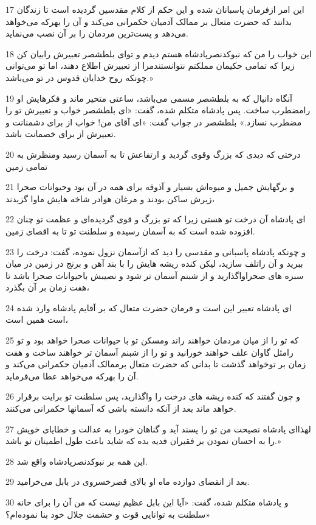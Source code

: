 \par 17 این امر ازفرمان پاسبانان شده و این حکم از کلام مقدسین گردیده است تا زندگان بدانند که حضرت متعال بر ممالک آدمیان حکمرانی می‌کند و آن را بهرکه می‌خواهد می‌دهد و پست‌ترین مردمان را بر آن نصب می‌نماید.
\par 18 این خواب را من که نبوکدنصرپادشاه هستم دیدم و تو‌ای بلطشصر تعبیرش رابیان کن زیرا که تمامی حکیمان مملکتم نتوانستندمرا از تعبیرش اطلاع دهند، اما تو می‌توانی چونکه روح خدایان قدوس در تو می‌باشد.»
\par 19 آنگاه دانیال که به بلطشصر مسمی می‌باشد، ساعتی متحیر ماند و فکرهایش او رامضطرب ساخت. پس پادشاه متکلم شده، گفت: «ای بلطشصر خواب و تعبیرش تو را مضطرب نسازد.» بلطشصر در جواب گفت: «ای آقای من! خواب از برای دشمنانت و تعبیرش از برای خصمانت باشد.
\par 20 درختی که دیدی که بزرگ وقوی گردید و ارتفاعش تا به آسمان رسید ومنظرش به تمامی زمین
\par 21 و برگهایش جمیل و میوه‌اش بسیار و آذوقه برای همه در آن بود وحیوانات صحرا زیرش ساکن بودند و مرغان هوادر شاخه هایش ماوا گزیدند،
\par 22 ‌ای پادشاه آن درخت تو هستی زیرا که تو بزرگ و قوی گردیده‌ای و عظمت تو چنان افزوده شده است که به آسمان رسیده و سلطنت تو تا به اقصای زمین.
\par 23 و چونکه پادشاه پاسبانی و مقدسی را دید که ازآسمان نزول نموده، گفت: درخت را ببرید و آن راتلف سازید، لیکن کنده ریشه هایش را با بند آهن و برنج در زمین در میان سبزه های صحراواگذارید و از شبنم آسمان تر شود و نصیبش باحیوانات صحرا باشد تا هفت زمان بر آن بگذرد،
\par 24 ‌ای پادشاه تعبیر این است و فرمان حضرت متعال که بر آقایم پادشاه وارد شده است همین است،
\par 25 که تو را از میان مردمان خواهند راند ومسکن تو با حیوانات صحرا خواهد بود و تو رامثل گاوان علف خواهند خورانید و تو را از شبنم آسمان تر خواهند ساخت و هفت زمان بر توخواهد گذشت تا بدانی که حضرت متعال برممالک آدمیان حکمرانی می‌کند و آن را بهر‌که می‌خواهد عطا می‌فرماید.
\par 26 و چون گفتند که کنده ریشه های درخت را واگذارید، پس سلطنت تو برایت برقرار خواهد ماند بعد از آنکه دانسته باشی که آسمانها حکمرانی می‌کنند.
\par 27 لهذا‌ای پادشاه نصیحت من تو را پسند آید و گناهان خودرا به عدالت و خطایای خویش را به احسان نمودن بر فقیران فدیه بده که شاید باعث طول اطمینان تو باشد.»
\par 28 این همه بر نبوکدنصرپادشاه واقع شد.
\par 29 بعد از انقضای دوازده ماه او بالای قصرخسروی در بابل می‌خرامید.
\par 30 و پادشاه متکلم شده، گفت: «آیا این بابل عظیم نیست که من آن را برای خانه سلطنت به توانایی قوت و حشمت جلال خود بنا نموده‌ام؟»
